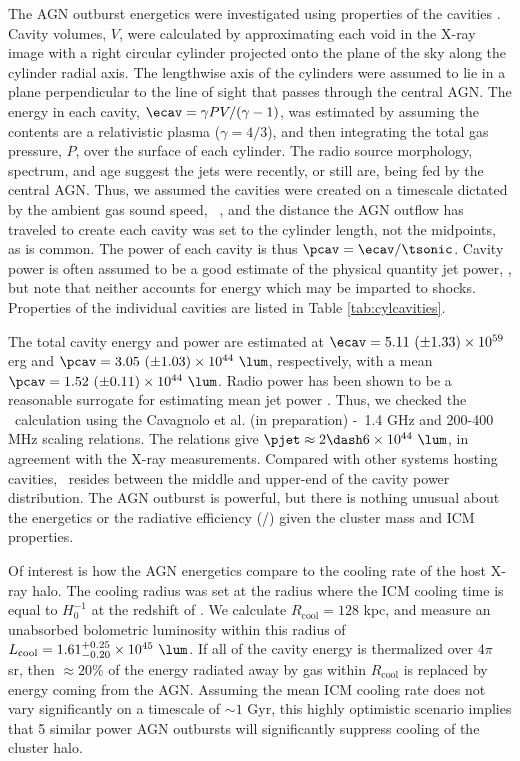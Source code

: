 \documentclass[useAMS,usenatbib]{mn2e}
\begin{document}
The AGN outburst energetics were investigated using properties of the
cavities \citep[see][for a review]{mcnamrev}. Cavity volumes, $V$,
were calculated by approximating each void in the X-ray image with a
right circular cylinder projected onto the plane of the sky along the
cylinder radial axis. The lengthwise axis of the cylinders were
assumed to lie in a plane perpendicular to the line of sight that
passes through the central AGN. The energy in each cavity, $\ecav =
\gamma PV/(\gamma-1)$, was estimated by assuming the contents are a
relativistic plasma ($\gamma = 4/3$), and then integrating the total
gas pressure, $P$, over the surface of each cylinder. The radio source
morphology, spectrum, and age suggest the jets were recently, or still
are, being fed by the central AGN. Thus, we assumed the cavities were
created on a timescale dictated by the ambient gas sound speed,
\tsonic\ \citep[see][]{birzan04}, and the distance the AGN outflow has
traveled to create each cavity was set to the cylinder length, not the
midpoints, as is common. The power of each cavity is thus $\pcav =
\ecav/\tsonic$. Cavity power is often assumed to be a good estimate of
the physical quantity jet power, \pjet, but note that neither accounts
for energy which may be imparted to shocks. Properties of the
individual cavities are listed in Table \ref{tab:cylcavities}.

The total cavity energy and power are estimated at $\ecav = 5.11 ~(\pm
1.33) \times 10^{59}$ erg and $\pcav = 3.05 ~(\pm 1.03) \times 10^{44}
~\lum$, respectively, with a mean $\pcav = 1.52 ~(\pm 0.11) \times
10^{44} ~\lum$. Radio power has been shown to be a reasonable
surrogate for estimating mean jet power \citep{birzan08}. Thus, we
checked the \pcav\ calculation using the Cavagnolo et al. (in
preparation) \pjet-\prad\ 1.4 GHz and 200-400 MHz scaling
relations. The relations give $\pjet \approx 2 \dash 6 \times 10^{44}
~\lum$, in agreement with the X-ray measurements. Compared with other
systems hosting cavities, \irs\ resides between the middle and
upper-end of the cavity power distribution. The AGN outburst is
powerful, but there is nothing unusual about the energetics or the
radiative efficiency (\prad/\pjet) given the cluster mass and ICM
properties.

Of interest is how the AGN energetics compare to the cooling rate of
the host X-ray halo. The cooling radius was set at the radius where
the ICM cooling time is equal to $H_0^{-1}$ at the redshift of
\irs. We calculate $R_{\mathrm{cool}} = 128$ kpc, and measure an
unabsorbed bolometric luminosity within this radius of
$L_{\mathrm{cool}} = 1.61^{+0.25}_{-0.20} \times 10^{45} ~\lum$. If
all of the cavity energy is thermalized over $4\pi$ sr, then $\approx
20\%$ of the energy radiated away by gas within $R_{\mathrm{cool}}$ is
replaced by energy coming from the AGN. Assuming the mean ICM cooling
rate does not vary significantly on a timescale of $\sim 1$ Gyr, this
highly optimistic scenario implies that 5 similar power AGN outbursts
will significantly suppress cooling of the cluster halo.
\end{document}
